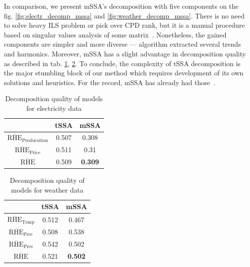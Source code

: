 	In comparison, we present mSSA's decomposition with five components on the fig. \ref{fig:electr_decomp_mssa} and \ref{fig:weather_decomp_mssa}. There is no need to solve heavy ILS problem or pick over CPD rank, but it is a manual procedure based on singular values analysis of some matrix~\cite{ecfb9dc578be43ae9ee8fc88b8ff9151}. Nonetheless, the gained  components are simpler and more diverse --- algorithm extracted several trends and harmonics. Moreover, mSSA has a slight advantage in decomposition quality as described in tab. \ref{tab:decomp_electr_results}, \ref{tab:decomp_weather_results}. To conclude, the complexity of tSSA decomposition is the major stumbling block of our method which requires development of its own solutions and heuristics. For the record, mSSA has already had those~\cite{ecfb9dc578be43ae9ee8fc88b8ff9151}.
	
	\def\arraystretch{1.2}
	\begin{table}[h!]
		\centering
		\caption{Decomposition quality of models for electricity data}\label{tab:decomp_electr_results}
		\begin{tabular}{|c|c|c|}
			\hline
			& tSSA  & mSSA           \\ \hline
			$ \overline{\text{RHE}}_{\text{Producution}} $  & 0.507 & 0.308          \\ \hline
			$ \overline{\text{RHE}}_{\text{Price}} $      & 0.511 & 0.31           \\ \hline
			$ \overline{\text{RHE}} $             & 0.509 & \textbf{0.309} \\ \hline
		\end{tabular}
	\end{table}
	
	\def\arraystretch{1.2}
	\begin{table}[h!]
		\centering
		\caption{Decomposition quality of models for weather data}\label{tab:decomp_weather_results}
		\begin{tabular}{|c|c|c|}
			\hline
			& tSSA  & mSSA           \\ \hline
			$ \overline{\text{RHE}}_{\text{Temp}} $   & 0.512 & 0.467          \\ \hline
			$ \overline{\text{RHE}}_{\text{Prec}} $ & 0.508 & 0.538          \\ \hline
			$ \overline{\text{RHE}}_{\text{Pres}} $   & 0.542 & 0.502          \\ \hline
			$ \overline{\text{RHE}} $         & 0.521 & \textbf{0.502} \\ \hline
		\end{tabular}
	\end{table}	
	
